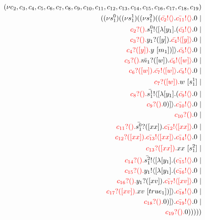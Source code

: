 \documentclass{article}
\begin{document}
\begin{align*}
 (\nu c_{2},c_{3},c_{4},c_{5},c_{6},c_{7},c_{8},c_{9},c_{10},c_{11},c_{12},c_{13},c_{14},c_{15},c_{16},c_{17},c_{18},c_{19}) \\ ( (\nu s^{0}_{1})( (\nu s^{1}_{1})( (\nu s^{2}_{1})((\color{red}\bar{c_{2}}! \langle  \rangle \color{black}.\color{red}\bar{c_{11}}! \langle  \rangle \color{black}.0  \ | \\ \color{red}c_{2}?().\color{black}\color{black}s^{0}_{1}! \langle [ \lambda [y_{1}].(\color{red}\bar{c_{3}}! \langle  \rangle \color{black}.0  \ | \\ \color{red}c_{3}?().\color{black}\color{black}y_{1}?([y]).\color{black}\color{red}\bar{c_{4}}! \langle [y] \rangle \color{black}.0  \ | \\ \color{red}c_{4}?([y]).\color{black}y \ [m_{1}])] \rangle \color{black}.\color{red}\bar{c_{5}}! \langle  \rangle \color{black}.0  \ | \\ \color{red}c_{5}?().\color{black}\color{black}\bar{m_{1}}?([w]).\color{black}\color{red}\bar{c_{6}}! \langle [w] \rangle \color{black}.0  \ | \\ \color{red}c_{6}?([w]).\color{black}\color{red}\bar{c_{7}}! \langle [w] \rangle \color{black}.\color{red}\bar{c_{8}}! \langle  \rangle \color{black}.0  \ | \\ \color{red}c_{7}?([w]).\color{black}w \ [s^{1}_{1}] \ | \\ \color{red}c_{8}?().\color{black}\color{black}\bar{s^{1}_{1}}! \langle [ \lambda [y_{1}].(\color{red}\bar{c_{9}}! \langle  \rangle \color{black}.0  \ | \\ \color{red}c_{9}?().\color{black}0 )] \rangle \color{black}.\color{red}\bar{c_{10}}! \langle  \rangle \color{black}.0  \ | \\ \color{red}c_{10}?().\color{black}0  \ | \\ \color{red}c_{11}?().\color{black}\color{black}\bar{s^{0}_{1}}?([xx]).\color{black}\color{red}\bar{c_{12}}! \langle [xx] \rangle \color{black}.0  \ | \\ \color{red}c_{12}?([xx]).\color{black}\color{red}\bar{c_{13}}! \langle [xx] \rangle \color{black}.\color{red}\bar{c_{14}}! \langle  \rangle \color{black}.0  \ | \\ \color{red}c_{13}?([xx]).\color{black}xx \ [s^{2}_{1}] \ | \\ \color{red}c_{14}?().\color{black}\color{black}\bar{s^{2}_{1}}! \langle [ \lambda [y_{1}].(\color{red}\bar{c_{15}}! \langle  \rangle \color{black}.0  \ | \\ \color{red}c_{15}?().\color{black}\color{black}y_{1}! \langle [ \lambda [y_{1}].(\color{red}\bar{c_{16}}! \langle  \rangle \color{black}.0  \ | \\ \color{red}c_{16}?().\color{black}\color{black}y_{1}?([xv]).\color{black}\color{red}\bar{c_{17}}! \langle [xv] \rangle \color{black}.0  \ | \\ \color{red}c_{17}?([xv]).\color{black}xv \ [true_{1}])] \rangle \color{black}.\color{red}\bar{c_{18}}! \langle  \rangle \color{black}.0  \ | \\ \color{red}c_{18}?().\color{black}0 )] \rangle \color{black}.\color{red}\bar{c_{19}}! \langle  \rangle \color{black}.0  \ | \\ \color{red}c_{19}?().\color{black}0 )))))
\end{align*}
\end{document}
